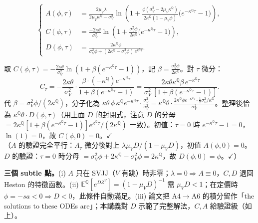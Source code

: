 \documentclass[12pt, a4paper]{article}
\theoremstyle{remark}
\newcommand{\E}{\mathbb{E}}
\newcommand{\Q}{\mathbb{Q}}
\begin{document}
\begin{keybox}[title={eq (11) = eq (A6)：三條 ODE 的封閉解}]
\begin{equation}
  \left\{
  \begin{aligned}
    A(\phi,\tau) &= \frac{2\mu_V\lambda}{2\mu_V\kappa^\Q - \sigma_V^2}
      \ln\!\left(1 + \frac{\phi(\sigma_V^2 - 2\mu_V\kappa^\Q)}{2\kappa^\Q(1-\mu_V\phi)}\big(e^{-\kappa^\Q\tau}-1\big)\right),\\[4pt]
    C(\phi,\tau) &= \frac{-2\kappa\theta}{\sigma_V^2}
      \ln\!\left(1 + \frac{\sigma_V^2\phi}{2\kappa^\Q}\big(e^{-\kappa^\Q\tau}-1\big)\right),\\[4pt]
    D(\phi,\tau) &= \frac{2\kappa^\Q\phi}{\sigma_V^2\phi + (2\kappa^\Q-\sigma_V^2\phi)\,e^{\kappa^\Q\tau}}.
  \end{aligned}
  \right.
  \tag{11}
\end{equation}
\end{keybox}

\begin{derivbox}[title={驗證 $C$ 滿足其 ODE 與初值}]
取 $C(\phi,\tau)=-\frac{2\kappa\theta}{\sigma_V^2}\ln(1+\beta(e^{-\kappa^\Q\tau}-1))$，記 $\beta=\frac{\sigma_V^2\phi}{2\kappa^\Q}$。對 $\tau$ 微分：
\[
  C_\tau = -\frac{2\kappa\theta}{\sigma_V^2}\cdot\frac{\beta\cdot(-\kappa^\Q)e^{-\kappa^\Q\tau}}{1+\beta(e^{-\kappa^\Q\tau}-1)}
  = \frac{2\kappa\theta\kappa^\Q\beta\,e^{-\kappa^\Q\tau}}{\sigma_V^2\,[1+\beta(e^{-\kappa^\Q\tau}-1)]}.
\]
代 $\beta=\sigma_V^2\phi/(2\kappa^\Q)$，分子化為 $\kappa\theta\,\phi\,\kappa^\Q e^{-\kappa^\Q\tau}\cdot\frac{\sigma_V^2}{\sigma_V^2}=\kappa^\Q\theta\cdot\frac{2\kappa^\Q\phi e^{-\kappa^\Q\tau}\cdot\frac12\sigma_V^2/\kappa^\Q}{\sigma_V^2}$。整理後恰為 $\kappa^\Q\theta\cdot D(\phi,\tau)$（用上面 $D$ 的封閉式，注意 $D$ 的分母 $=2\kappa^\Q[1+\beta(e^{-\kappa^\Q\tau}-1)]e^{\kappa^\Q\tau}/(2\kappa^\Q)$ 一致）。初值：$\tau=0$ 時 $e^{-\kappa^\Q\tau}-1=0$，$\ln(1)=0$，故 $C(\phi,0)=0$。$\checkmark$\\[2pt]
（$A$ 的驗證完全平行：$A_\tau$ 微分後對上 $\lambda\mu_V D/(1-\mu_V D)$，初值 $A(\phi,0)=0$。$D$ 的驗證：$\tau=0$ 時分母 $=\sigma_V^2\phi+2\kappa^\Q-\sigma_V^2\phi=2\kappa^\Q$，故 $D(\phi,0)=\phi$。$\checkmark$）
\end{derivbox}

\textbf{三個 subtle 點。}(i) $A$ 只在 SVJJ（$V$ 有跳）時非零；$\lambda=0\Rightarrow A\equiv0$，$C,D$ 退回 Heston 的特徵函數。(ii) $\E^\Q[e^{DZ^V}]=(1-\mu_V D)^{-1}$ 需 $\mu_V D<1$；在定價時 $\phi=-sa<0\Rightarrow D<0$，此條件自動滿足。(iii) 論文把 A4$\to$A6 的積分留作「the solutions to these ODEs are」；本講義對 $D$ 示範了完整解法，$C,A$ 給驗證級（如上）。
\end{document}

